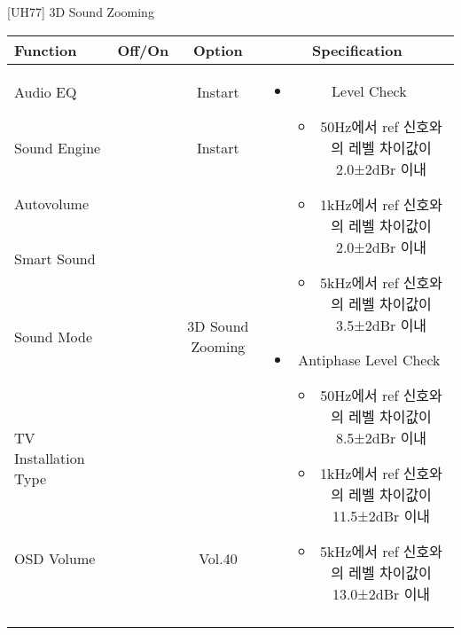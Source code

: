 \begin{frame}[t]{[UH77] 3D Sound Zooming}
\begin{tiny}
\begin{tabular}{@{}lccc@{}}
\toprule
Function & Off/On & Option & Specification \\
\midrule
Audio EQ & \color{black}{Off} & Instart &
\multirow{10}{60mm}{
\begin{itemize}
\item Level Check
	\begin{itemize}
	\item 50Hz에서 ref 신호와의 레벨 차이값이 2.0±2dBr 이내
	\item 1kHz에서 ref 신호와의 레벨 차이값이 2.0±2dBr 이내
	\item 5kHz에서 ref 신호와의 레벨 차이값이 3.5±2dBr 이내
	\end{itemize}
\item Antiphase Level Check
	\begin{itemize}
	\item 50Hz에서 ref 신호와의 레벨 차이값이 8.5±2dBr 이내
	\item 1kHz에서 ref 신호와의 레벨 차이값이 11.5±2dBr 이내
	\item 5kHz에서 ref 신호와의 레벨 차이값이 13.0±2dBr 이내
	\end{itemize}
\end{itemize}
} \\
Sound Engine & \color{blue}{On} & Instart & \\
Autovolume & \color{black}{Off} & & \\
Smart Sound & \color{black}{Off} & & \\
Sound Mode & \color{blue}{On} & 3D Sound Zooming & \\
TV Installation Type & \color{blue}{On} & \color{black}{Standtype1} & \\
OSD Volume & \color{blue}{On} & Vol.40 & \\
& & & \\
& & & \\
& & & \\
& & & \\
\midrule
\end{tabular}
\end{tiny}

\end{frame}
